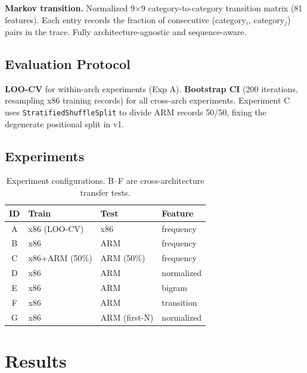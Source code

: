 \documentclass[10pt,twocolumn]{article}
\begin{document}
\textbf{Markov transition.} Normalized 9$\times$9 category-to-category
transition matrix (81 features). Each entry records the fraction of
consecutive (category$_i$, category$_j$) pairs in the trace. Fully
architecture-agnostic and sequence-aware.

\subsection{Evaluation Protocol}

\textbf{LOO-CV} for within-arch experiments (Exp A). \textbf{Bootstrap
CI} (200 iterations, resampling x86 training records) for all cross-arch
experiments. Experiment C uses \texttt{StratifiedShuffleSplit} to divide
ARM records 50/50, fixing the degenerate positional split in v1.

\subsection{Experiments}

\begin{table}[h]
\centering
\small
\begin{tabular}{clll}
\toprule
\textbf{ID} & \textbf{Train} & \textbf{Test} & \textbf{Feature} \\
\midrule
A & x86 (LOO-CV) & x86 & frequency \\
B & x86 & ARM & frequency \\
C & x86+ARM (50\%) & ARM (50\%) & frequency \\
D & x86 & ARM & normalized \\
E & x86 & ARM & bigram \\
F & x86 & ARM & transition \\
G & x86 & ARM (first-N) & normalized \\
\bottomrule
\end{tabular}
\caption{Experiment configurations. B--F are cross-architecture transfer tests.}
\end{table}

\section{Results}
\end{document}
